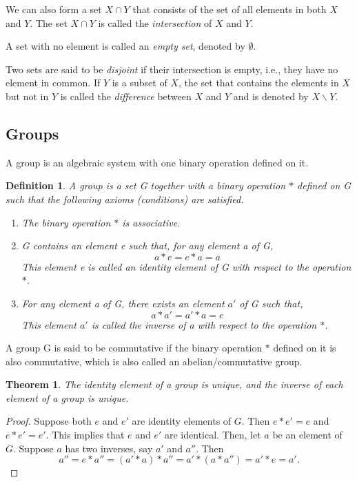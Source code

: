 \documentclass[11pt]{article}
\newtheorem{theorem}{Theorem}
\newtheorem{definition}{Definition}
\begin{document}
We can also form a set $X \cap Y$ that consists of the set of all elements in both $X$ and $Y$. The set $X \cap Y$ is called the \textit{intersection} of $X$ and $Y$. 

A set with no element is called an \textit{empty set}, denoted by $\emptyset$. 

Two sets are said to be \textit{disjoint} if their intersection is empty, i.e., they have no element in common. If $Y$ is a subset of $X$, the set that contains the elements in $X$ but not in $Y$ is called the \textit{difference} between $X$ and $Y$ and is denoted by $X \backslash Y$.

\subsection{Groups}

A group is an algebraic system with one binary operation defined on it.

\begin{definition}
  A group is a set G together with a binary operation $\ast$ defined on G such that the following axioms (conditions) are satisfied.
  \begin{enumerate}
    \item The binary operation $\ast$ is associative. 
    \item G contains an element e such that, for any element a of G,
    \[
      a \ast e = e \ast a = a
    \]
    This element e is called an identity element of G with respect to the operation $\ast$.
    \item For any element a of G, there exists an element $a'$ of G such that,
    \[
      a \ast a' = a' \ast a = e
    \]
    This element $a'$ is called the inverse of a with respect to the operation $\ast$.
  \end{enumerate}
\end{definition}
A group G is said to be commutative if the binary operation $\ast$ defined on it is also commutative, which is also called an abelian/commutative group.

\begin{theorem}
  The identity element of a group is unique, and the inverse of each element of a group is unique.
\end{theorem}

\begin{proof}
Suppose both $e$ and $e'$ are identity elements of $G$. Then $e * e' = e$ and $e * e' = e'$. This implies that $e$ and $e'$ are identical. 
Then, let $a$ be an element of $G$. Suppose $a$ has two inverses, say $a'$ and $a''$. Then
\[
a'' = e * a'' = (a' * a) * a'' = a' * (a * a'') = a' * e = a'.
\]
\end{proof}
\end{document}
